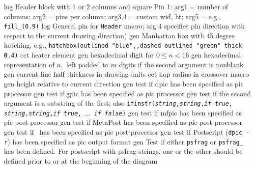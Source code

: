   {log}
  {Header block with 1 or 2 columns and square Pin 1:
   arg1 = number of columns;
   arg2 = pins per column;
   arg3,4 = custom wid, ht;
   arg5 = e.g., {\tt fill\_(0.9)}
    }
  {log}
  {General pin for {\tt Header} macro; arg 4 specifies pin direction
   with respect to the current drawing direction)}
  {gen}
  {Manhattan box with 45 degree hatching, e.g.,
   {\tt hatchbox(outlined "blue",,dashed outlined "green" thick 0.4)}}
  {cct}
  {heater element}
  {gen}
  {hexadecimal digit for $0 \leq n < 16$}
  {gen}
  {hexadecimal representation of $n,$ left padded to $m$ digits if the second
   argument is nonblank}
  {gen}
  {current line half thickness in drawing units}
  {cct}
  {hop radius in crossover macro}
  {gen}
  {height relative to current direction}
%
  {gen}
  {test if dpic has been specified as pic processor}
  {gen}
  {test if gpic has been specified as pic processor}
  {gen}
  {test if the second argument is a substring of the first; also
  {\tt ifinstr({\sl string},{\sl string},{\sl if true},{\sl
  string},{\sl string},{\sl if true}, $\ldots$ {\sl if false})}
    }
  {gen}
  {test if mfpic has been specified as pic post-processor}
  {gen}
  {test if MetaPost has been specified as pic post-processor}
  {gen}
  {test if \TPGF~has been specified as pic post-processor}
  {gen}
  {test if Postscript ({\tt dpic -r}) has been specified as pic output format}
  {gen}
  {Test if either {\tt psfrag} or {\tt psfrag\_} has been defined. For
   postscript with psfrag strings, one or the other should be defined
   prior to or at the beginning of the diagram}
